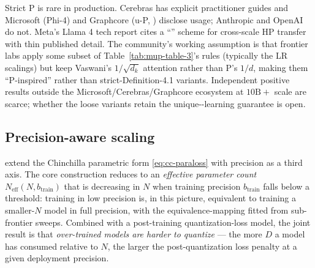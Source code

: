 \begin{contradiction}
Strict \citep[Definition 4.1]{yang2022-mup} \textmu P is rare in
production. Cerebras has explicit practitioner guides and Microsoft
(Phi-4) and Graphcore (u-\textmu P, \citealp{u-mup2024}) disclose
usage; Anthropic and OpenAI do not. Meta's Llama 4 tech report
\citep{meta-llama4} cites a ``'' scheme for cross-scale HP
transfer with thin published detail. The community's working
assumption is that frontier labs apply some subset of
Table~\ref{tab:mup-table-3}'s rules (typically the LR scalings) but
keep Vaswani's $1/\sqrt{d_k}$ attention rather than \textmu P's $1/d$,
making them ``\textmu P-inspired'' rather than strict-Definition-4.1
variants. Independent positive results outside the
Microsoft/Cerebras/Graphcore ecosystem at $10\text{B}{+}$ scale are
scarce; whether the loose variants retain the unique--learning
guarantee is open.
\end{contradiction}

\subsection{Precision-aware scaling}
\label{sec:scaling-precision}

\citet{scaling-laws-precision-2024} extend the Chinchilla parametric
form \cref{eq:cc-paraloss} with precision as a third axis. The core
construction reduces to an \emph{effective parameter count}
$N_{\text{eff}}(N, b_{\text{train}})$ that is decreasing in $N$ when
training precision $b_{\text{train}}$ falls below a threshold:
training in low precision is, in this picture, equivalent to training
a smaller-$N$ model in full precision, with the equivalence-mapping
fitted from sub-frontier sweeps. Combined with a post-training
quantization-loss model, the joint result is that \emph{over-trained
models are harder to quantize} --- the more $D$ a model has consumed
relative to $N$, the larger the post-quantization loss penalty at a
given deployment precision.

